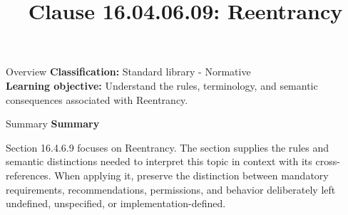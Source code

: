 \documentclass[10pt,letterpaper]{article}
\title{Clause 16.04.06.09: Reentrancy}
\author{}
\date{}
\begin{document}
\maketitle
\begin{CornellOverviewBox}{Overview}
\textbf{Classification:} Standard library - Normative\\[2pt]
\textbf{Learning objective:} Understand the rules, terminology, and semantic consequences associated with Reentrancy.
\end{CornellOverviewBox}\begin{CornellSummaryBox}{Summary}
{\sffamily\bfseries\color{Accent} Summary}\par\vspace{3pt}Section 16.4.6.9 focuses on Reentrancy. The section supplies the rules and semantic distinctions needed to interpret this topic in context with its cross-references. When applying it, preserve the distinction between mandatory requirements, recommendations, permissions, and behavior deliberately left undefined, unspecified, or implementation-defined.
\end{CornellSummaryBox}
\end{document}

